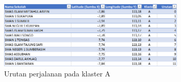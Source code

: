 \begin{figure}[h!]
	\centering
	\includegraphics[width=0.8\textwidth]{data hasil.png}
	\caption{Urutan perjalanan pada klaster A}
	\label{fig:datahasilmtsp}
\end{figure}